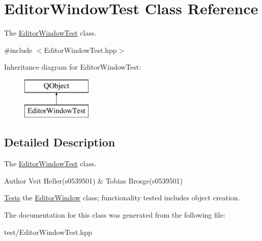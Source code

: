 \hypertarget{classEditorWindowTest}{\section{Editor\+Window\+Test Class Reference}
\label{classEditorWindowTest}
}


The \hyperlink{classEditorWindowTest}{Editor\+Window\+Test} class.  




{\ttfamily \#include $<$Editor\+Window\+Test.\+hpp$>$}

Inheritance diagram for Editor\+Window\+Test\+:\begin{figure}[H]
\begin{center}
\leavevmode
\includegraphics[height=2.000000cm]{classEditorWindowTest}
\end{center}
\end{figure}


\subsection{Detailed Description}
The \hyperlink{classEditorWindowTest}{Editor\+Window\+Test} class. 

\begin{DoxyAuthor}{Author}
Veit Heller(s0539501) \& Tobias Brosge(s0539501)
\end{DoxyAuthor}
\hyperlink{structTests}{Tests} the \hyperlink{classEditorWindow}{Editor\+Window} class; functionality tested includes object creation. 

The documentation for this class was generated from the following file\+:\begin{DoxyCompactItemize}
\item 
test/Editor\+Window\+Test.\+hpp\end{DoxyCompactItemize}
